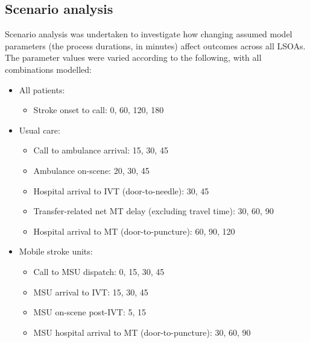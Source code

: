\subsection{Scenario analysis}

Scenario analysis was undertaken to investigate how changing assumed model parameters (the process durations, in minutes) affect outcomes across all LSOAs. The parameter values were varied according to the following, with all combinations modelled:

\vspace{5mm}

\begin{minipage}{1.0\textwidth}  %
\begin{itemize}
    \item All patients:
    \begin{itemize}
        \item Stroke onset to call: 0, 60, 120, 180
    \end{itemize}
    \item Usual care:
    \begin{itemize}
        \item Call to ambulance arrival: 15, 30, 45
        \item Ambulance on-scene: 20, 30, 45
        \item Hospital arrival to IVT (door-to-needle): 30, 45
        \item Transfer-related net MT delay (excluding travel time): 30, 60, 90
        \item Hospital arrival to MT (door-to-puncture): 60, 90, 120
    \end{itemize}
    \item Mobile stroke units:
    \begin{itemize}
        \item Call to MSU dispatch: 0, 15, 30, 45
        \item MSU arrival to IVT: 15, 30, 45
        \item MSU on-scene post-IVT: 5, 15
        \item MSU hospital arrival to MT (door-to-puncture): 30, 60, 90
    \end{itemize}
\end{itemize}
\end{minipage}

\vspace{5mm}

